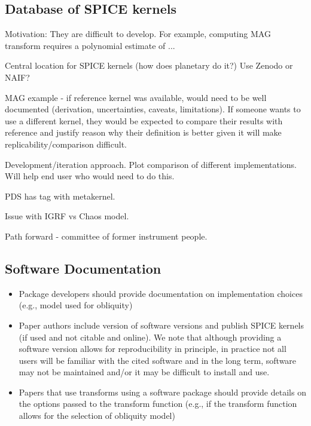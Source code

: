\documentclass[draft]{agujournal2019}
\begin{document}
\subsection{Database of SPICE kernels}

Motivation: They are difficult to develop. For example, computing MAG transform requires a polynomial estimate of ...




Central location for SPICE kernels (how does planetary do it?) Use Zenodo or NAIF?

MAG example - if reference kernel was available, would need to be well documented (derivation, uncertainties, caveats, limitations). If someone wants to use a different kernel, they would be expected to compare their results with reference and justify reason why their definition is better given it will make replicability/comparison difficult.

Development/iteration approach. Plot comparison of different implementations. Will help end user who would need to do this.

PDS has tag with metakernel.

Issue with IGRF vs Chaos model.

Path forward - committee of former instrument people.


\subsection{Software Documentation}

\begin{itemize}

  \item Package developers should provide documentation on implementation choices (e.g., model used for obliquity)
  \item Paper authors include version of software versions and publish SPICE kernels (if used and not citable and online). We note that although providing a software version allows for reproducibility in principle, in practice not all users will be familiar with the cited software and in the long term, software may not be maintained and/or it may be difficult to install and use. 
  \item Papers that use transforms using a software package should provide details on the options passed to the transform function (e.g., if the transform function allows for the selection of obliquity model)

\end{itemize}


\end{document}
